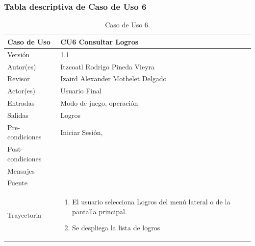 \documentclass{article}
\begin{document}
\subsubsection{Tabla descriptiva de Caso de Uso 6}
\begin{table}[H]
\caption{Caso de Uso 6.}
\begin{tabular}{|M{4cm}|M{12cm}|}
\hline
Caso de Uso & CU6 Consultar Logros\\ \hline
Versión & 1.1\\ \hline
Autor(es) & Itzcoatl Rodrigo Pineda Vieyra\\ \hline
Revisor & Izaird Alexander Mothelet Delgado \\ \hline
Actor(es) & Usuario Final \\ \hline
Entradas &  Modo de juego, operación \\ \hline
Salidas & Logros \\ \hline
Pre-condiciones & Iniciar Sesión,  \\ \hline
Post-condiciones & \\ \hline
Mensajes & \\ \hline 
Fuente &  \\ \hline	
Trayectoria &
\begin{enumerate}
\item El usuario selecciona Logros del menú lateral o de la pantalla principal.
\item Se despliega la lista de logros 
\end{enumerate}
\\ \hline 
\end{tabular}
\end{table}
\end{document}
